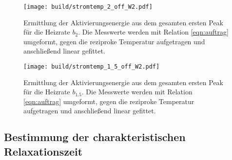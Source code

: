 \begin{figure}
  \centering
  \texttt{[image: build/stromtemp\_2\_off\_W2.pdf]}
  \caption{Ermittlung der Aktivierungsenergie aus dem gesamten ersten Peak für die Heizrate $b_{2}$. Die Messwerte
  werden mit Relation \eqref{eqn:auftrag} umgeformt, gegen die reziproke Temperatur aufgetragen und anschließend
  linear gefittet.}
  \label{fig:messwerte2offW2}
\end{figure}

\begin{figure}
  \centering
  \texttt{[image: build/stromtemp\_1\_5\_off\_W2.pdf]}
  \caption{Ermittlung der Aktivierungsenergie aus dem gesamten ersten Peak für die Heizrate $b_{1.5}$. Die Messwerte
  werden mit Relation \eqref{eqn:auftrag} umgeformt, gegen die reziproke Temperatur aufgetragen und anschließend
  linear gefittet.}
  \label{fig:messwerte15offW2}
\end{figure}

\subsection{Bestimmung der charakteristischen Relaxationszeit}

